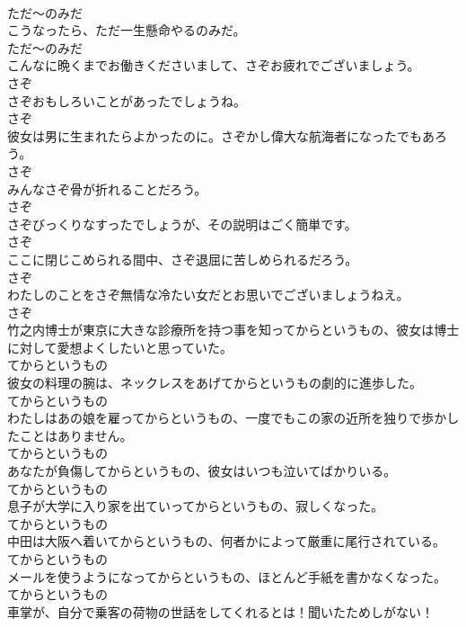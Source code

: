 \documentclass[8pt]{extreport}
\begin{document}
\begin{CJK}{UTF8}{min}
\\	ただ～のみだ	
\\	こうなったら、ただ一生懸命やるのみだ。	
\\	ただ～のみだ	
\\	こんなに晩くまでお働きくださいまして、さぞお疲れでございましょう。	
\\	さぞ	
\\	さぞおもしろいことがあったでしょうね。	
\\	さぞ	
\\	彼女は男に生まれたらよかったのに。さぞかし偉大な航海者になったでもあろう。	
\\	さぞ	
\\	みんなさぞ骨が折れることだろう。	
\\	さぞ	
\\	さぞびっくりなすったでしょうが、その説明はごく簡単です。	
\\	さぞ	
\\	ここに閉じこめられる間中、さぞ退屈に苦しめられるだろう。	
\\	さぞ	
\\	わたしのことをさぞ無情な冷たい女だとお思いでございましょうねえ。	
\\	さぞ	
\\	竹之内博士が東京に大きな診療所を持つ事を知ってからというもの、彼女は博士に対して愛想よくしたいと思っていた。	
\\	てからというもの	
\\	彼女の料理の腕は、ネックレスをあげてからというもの劇的に進歩した。	
\\	てからというもの	
\\	わたしはあの娘を雇ってからというもの、一度でもこの家の近所を独りで歩かしたことはありません。	
\\	てからというもの	
\\	あなたが負傷してからというもの、彼女はいつも泣いてばかりいる。	
\\	てからというもの	
\\	息子が大学に入り家を出ていってからというもの、寂しくなった。	
\\	てからというもの	
\\	中田は大阪へ着いてからというもの、何者かによって厳重に尾行されている。	
\\	てからというもの	
\\	メールを使うようになってからというもの、ほとんど手紙を書かなくなった。	
\\	てからというもの	
\\	車掌が、自分で乗客の荷物の世話をしてくれるとは！聞いたためしがない！	

\end{CJK}
\end{document}
